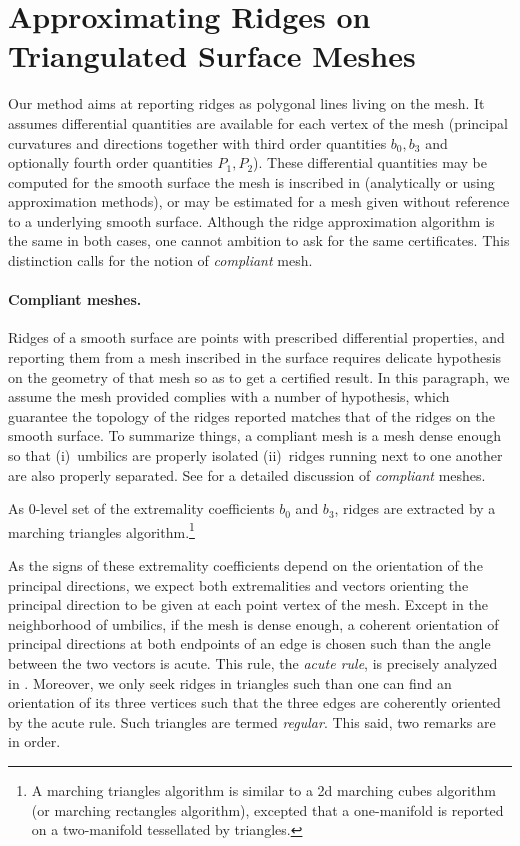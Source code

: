 \section{Approximating  Ridges on Triangulated Surface Meshes}
\label{ridge-mesh}

Our method aims at reporting ridges as polygonal lines living on the
mesh. It assumes differential quantities are available for each vertex
of the mesh (principal curvatures and directions together with third
order quantities $b_0, b_3$ and optionally fourth order quantities
$P_1, P_2$). These differential quantities may be computed for the
smooth surface the mesh is inscribed in (analytically or using
approximation methods), or may be estimated for a mesh given without
reference to a underlying smooth surface. Although the ridge
approximation algorithm is the same in both cases, one cannot ambition
to ask for the same certificates.  This distinction calls for the
notion of {\em compliant} mesh.


\paragraph{Compliant meshes.}
Ridges of a smooth surface are points with prescribed differential
properties, and reporting them from a mesh inscribed in the surface
requires delicate hypothesis on the geometry of that mesh so as to get
a certified result. In this paragraph, we assume the mesh provided
complies with a number of hypothesis, which guarantee the topology of
the ridges reported matches that of the ridges on the smooth
surface. To summarize things, a compliant mesh is a mesh dense enough
so that (i)\ umbilics are properly isolated (ii)\ ridges running next
to one another are also properly separated.
See \cite{cgal:cp-tdare-05} for a detailed discussion of {\em
compliant} meshes.  \medskip

As 0-level set of the extremality coefficients $b_0$ and $b_3$, ridges
are extracted by a marching triangles algorithm.\footnote{A marching
triangles algorithm is similar to a 2d marching cubes algorithm (or
marching rectangles algorithm), excepted that a one-manifold is
reported on a two-manifold tessellated by triangles.}

As the signs of these extremality coefficients depend on the
orientation of the principal directions, we expect both extremalities
and vectors orienting the principal direction to be given at each
point vertex of the mesh. Except in the neighborhood of umbilics, if
the mesh is dense enough, a coherent orientation of principal
directions at both endpoints of an edge is chosen such than the angle
between the two vectors is acute. This rule, the {\em acute rule}, is
precisely analyzed in \cite{cgal:cp-tdare-05}.
Moreover, we only seek ridges in triangles such than one can find an
orientation of its three vertices such that the three edges are
coherently oriented by the acute rule. Such triangles are termed
{\em regular}. This said, two remarks are in order.

